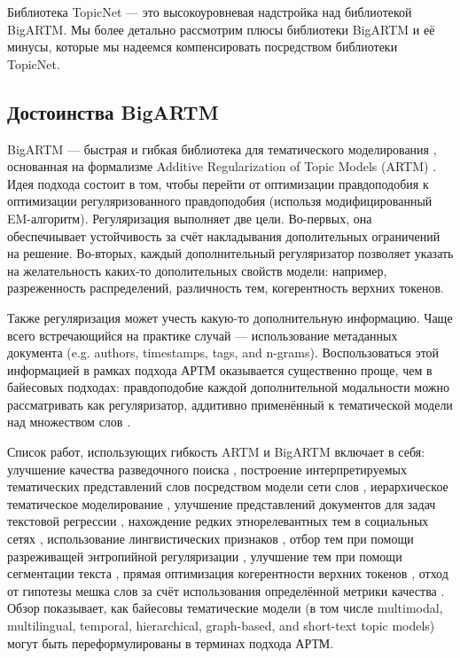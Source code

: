 Библиотека TopicNet --- это высокоуровневая надстройка над библиотекой BigARTM. Мы более детально рассмотрим плюсы библиотеки \mbox{BigARTM} и её минусы, которые мы надеемся компенсировать посредством библиотеки TopicNet.

\subsection{Достоинства BigARTM}


BigARTM --- быстрая и гибкая библиотека для тематического моделирования \cite{frei2016parallel}, основанная на формализме Additive Regularization of Topic Models (ARTM) \cite{voron14dan-eng}. Идея подхода состоит в том, чтобы перейти от оптимизации правдоподобия к оптимизации регуляризованного правдоподобия (использя модифицированный EM-алгоритм). 
Регуляризация выполняет две цели. Во-первых, она обеспечиывает устойчивость за счёт накладывания дополительных ограничений на решение. Во-вторых, каждый дополнительный регуляризатор позволяет указать на желательность каких-то дополительных свойств модели: например, разреженность распределений, различность тем, когерентность верхних токенов. 

Также регуляризация может учесть какую-то дополнительную информацию. Чаще всего встречающийся на практике случай --- использование метаданных документа (e.g. authors, timestamps, tags, and n-grams). Воспользоваться этой информацией в рамках подхода АРТМ оказывается существенно проще, чем в байесовых подходах: правдоподобие каждой дополнительной модальности можно рассматривать как регуляризатор, аддитивно применённый к тематической модели над множеством слов \cite{voron15nonbayesian}.

Список работ, использующих гибкость ARTM и BigARTM включает в себя: улучшение качества разведочного поиска \cite{yanina17technews}, 
построение интерпретируемых тематических представлений слов посредством модели сети слов \cite{potapenko17interpretable}, 
иерархическое тематическое моделирование \cite{chirkova16additive}, 
улучшение представлений документов для задач текстовой регрессии \cite{sokolov15topic}, 
нахождение редких этнорелевантных тем в социальных сетях \cite{apishev16additive,apishev16mining}, 
использование лингвистических признаков \cite{popov_hier}, отбор тем при помощи разреживащей энтропийной регуляризации \cite{voron15slds}, улучшение тем при помощи сегментации текста \cite{skachkov}, 
прямая оптимизация когерентности верхних токенов \cite{4keys}, 
отход от гипотезы мешка слов за счёт использования определённой метрики качества \cite{intracoh}. 
Обзор \cite{kochedykov2017fast} показывает, как байесовы тематические модели (в том числе multimodal, multilingual, temporal, hierarchical, graph-based, and short-text topic models) могут быть переформулированы в терминах подхода АРТМ.

